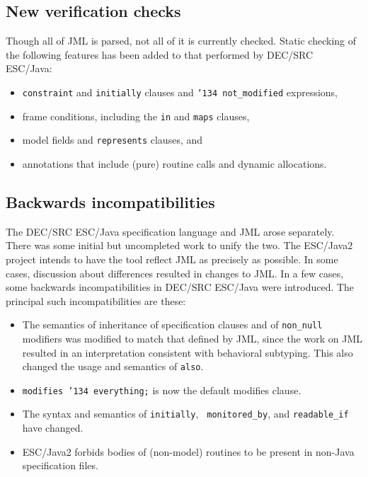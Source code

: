 \documentclass{acm_proc_article-sp}
\begin{document}
\subsection{New verification checks}
Though all of JML is parsed, not all of it is currently checked.
Static checking of the following features has been added to that performed by
DEC/SRC ESC/Java: 
\setlength{\partopsep}{0in}\setlength{\parskip}{0in}\setlength{\itemsep}{0in}\setlength{\topsep}{0in}
\begin{itemize}
\setlength{\partopsep}{0in}\setlength{\parskip}{0in}\setlength{\itemsep}{0in}\setlength{\topsep}{0in}
\item \texttt{constraint} and \texttt{initially} clauses and \texttt{\char'134 not\_modified} expressions,
\item frame conditions, including the \texttt{in} and \texttt{maps} clauses,
\item model fields and \texttt{represents} clauses, and
\item annotations that include (pure) routine calls and dynamic allocations.
\end{itemize}

\subsection{Backwards incompatibilities}
The DEC/SRC ESC/Java specification language and JML arose separately.  There
was some initial but uncompleted work to unify the two.  The ESC/Java2
project intends to have the tool reflect JML as precisely as possible.
In some cases, discussion about differences resulted in changes to JML.  In
a few cases, some backwards incompatibilities in DEC/SRC ESC/Java were
introduced.  The principal such incompatibilities are these:
\setlength{\partopsep}{0in}\setlength{\parskip}{0in}\setlength{\itemsep}{0in}\setlength{\topsep}{0in}
\begin{itemize}
\setlength{\partopsep}{0in}\setlength{\parskip}{0in}\setlength{\itemsep}{0in}\setlength{\topsep}{0in}
\item The semantics of inheritance of specification clauses and of
  \texttt{non\_null} modifiers was modified to match that defined by
  JML, since the work on JML resulted in an interpretation consistent
  with behavioral subtyping.  This also changed the usage and
  semantics of \texttt{also}.
\item \texttt{modifies \char'134 everything;} is now the default
  modifies clause.
\item The syntax and semantics of \texttt{initially}, {\tt
    monitored\_by}, and \texttt{readable\_if} have changed.
\item ESC/Java2 forbids bodies of (non-model) routines to be present
  in non-Java specification files.
\end{itemize}
\end{document}
